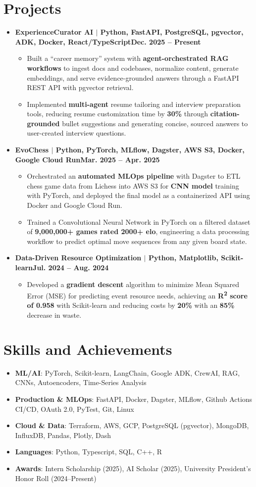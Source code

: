 \documentclass[letterpaper,10pt]{article}
\newcommand{\resumeSubHeadingListStart}{\begin{itemize}[leftmargin=0pt,label={},itemsep=2pt]}
\newcommand{\resumeSubHeadingListEnd}{\end{itemize}}
\newcommand{\resumeItemListStart}{\begin{itemize}[label=\textbullet,leftmargin=0.2in,itemsep=1pt]}
\newcommand{\resumeItemListEnd}{\end{itemize}}
\newcommand{\resumeItem}[1]{\item #1}
\begin{document}
\section{\textbf{Projects}}
\resumeSubHeadingListStart
  \item{\textbf{ExperienceCurator AI $|$ Python, FastAPI, PostgreSQL, pgvector, ADK, Docker, React/TypeScript}}\hfill\textbf{Dec. 2025 -- Present}
  \resumeItemListStart
  \resumeItem{Built a ``career memory'' system with \textbf{agent-orchestrated RAG workflows} to ingest docs and codebases, normalize content, generate embeddings, and serve evidence-grounded answers through a FastAPI REST API with pgvector retrieval.}
  \resumeItem{Implemented \textbf{multi-agent} resume tailoring and interview preparation tools, reducing resume customization time by \textbf{30\%} through \textbf{citation-grounded} bullet suggestions and generating concise, sourced answers to user-created interview questions.}
  \resumeItemListEnd
  \item{\textbf{EvoChess $|$ Python, PyTorch, MLflow, Dagster, AWS S3, Docker, Google Cloud Run}}\hfill\textbf{Mar. 2025 -- Apr. 2025}
  \resumeItemListStart
  \resumeItem{Orchestrated an \textbf{automated MLOps pipeline} with Dagster to ETL chess game data from Lichess into AWS S3 for \textbf{CNN model} training with PyTorch, and deployed the final model as a containerized API using Docker and Google Cloud Run.}
  \resumeItem{Trained a Convolutional Neural Network in PyTorch on a filtered dataset of \textbf{9,000,000+ games rated 2000+ elo}, engineering a data processing workflow to predict optimal move sequences from any given board state.}
  \resumeItemListEnd
  \item{\textbf{Data-Driven Resource Optimization $|$ Python, Matplotlib, Scikit-learn}}\hfill\textbf{Jul. 2024 -- Aug. 2024}
  \resumeItemListStart
    \resumeItem{Developed a \textbf{gradient descent} algorithm to minimize Mean Squared Error (MSE) for predicting event resource needs, achieving an \textbf{R\textsuperscript{2} score of 0.958} with Scikit-learn and reducing costs by \textbf{20\%} with an \textbf{85\%} decrease in waste.}
  \resumeItemListEnd
\resumeSubHeadingListEnd

\section{\textbf{Skills and Achievements}}
\resumeSubHeadingListStart
  \item{\textbf{ML/AI}: PyTorch, Scikit-learn, LangChain, Google ADK, CrewAI, RAG, CNNs, Autoencoders, Time-Series Analysis}
  \item{\textbf{Production \& MLOps}: FastAPI, Docker, Dagster, MLflow, Github Actions CI/CD, OAuth 2.0, PyTest, Git, Linux}
  \item{\textbf{Cloud \& Data}: Terraform, AWS, GCP, PostgreSQL (pgvector), MongoDB, InfluxDB, Pandas, Plotly, Dash}
  \item{\textbf{Languages}: Python, Typescript, SQL, C++, R}
  \item{\textbf{Awards}: Intern Scholarship (2025), AI Scholar (2025), University President's Honor Roll (2024--Present)}
\resumeSubHeadingListEnd
\end{document}
